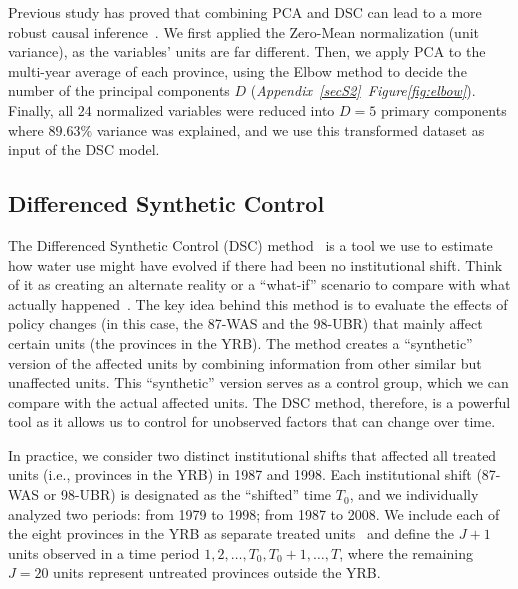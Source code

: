 \documentclass[preprint, 12pt]{elsarticle}
\begin{document}
Previous study has proved that combining PCA and DSC can lead to a more robust causal inference~\cite{bayani2021}.
We first applied the Zero-Mean normalization (unit variance), as the variables' units are far different. Then, we apply PCA to the multi-year average of each province, using the Elbow method to decide the number of the principal components $D$ (\textit{Appendix~\ref{secS2}~Figure\ref{fig:elbow}}).
Finally, all $24$ normalized variables were reduced into $D = 5$ primary components where $89.63\%$ variance was explained, and we use this transformed dataset as input of the DSC model.

\subsection{Differenced Synthetic Control}\label{sec:DSC}

The Differenced Synthetic Control (DSC) method~\cite{arkhangelsky2021} is a tool we use to estimate how water use might have evolved if there had been no institutional shift.
Think of it as creating an alternate reality or a ``what-if'' scenario to compare with what actually happened~\cite{abadie2010, abadie2015, hill2021}.
The key idea behind this method is to evaluate the effects of policy changes (in this case, the 87-WAS and the 98-UBR) that mainly affect certain units (the provinces in the YRB).
The method creates a ``synthetic'' version of the affected units by combining information from other similar but unaffected units. This ``synthetic'' version serves as a control group, which we can compare with the actual affected units.
The DSC method, therefore, is a powerful tool as it allows us to control for unobserved factors that can change over time.

In practice, we consider two distinct institutional shifts that affected all treated units (i.e., provinces in the YRB) in 1987 and 1998.
Each institutional shift (87-WAS or 98-UBR) is designated as the ``shifted'' time $T_0$, and we individually analyzed two periods: from 1979 to 1998; from 1987 to 2008.
We include each of the eight provinces in the YRB as separate treated units~\cite{abadie2021} and define the $J+1$ units observed in a time period $1, 2, \dots, T_0, T_0 + 1, \dots, T$, where the remaining $J=20$ units represent untreated provinces outside the YRB.\
\end{document}
